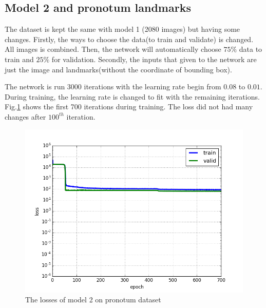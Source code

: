 \subsection{Model 2 and pronotum landmarks}
The dataset is kept the same with model 1 (2080 images) but having some changes. Firstly, the ways to choose the data(to train and validate) is changed. All images is combined. Then, the network will automatically choose $75 \%$ data to train and $25 \%$ for validation. Secondly, the inputs that given to the network are just the image and landmarks(without the coordinate of bounding box).

The network is run 3000 iterations with the learning rate begin from $0.08$ to $0.01$. During training, the learning rate is changed to fit with the remaining iterations\cite{lecun2012efficient}. Fig.\ref{model2pl} shows the first 700 iterations during training. The loss did not had many changes after $100^{th}$ iteration.

\begin{figure}[h!]
	\centering
	\includegraphics[scale=0.4]{images/figure_1_loss_celia}
	\caption{The losses of model 2 on pronotum dataset}
	\label{model2pl}
\end{figure}

